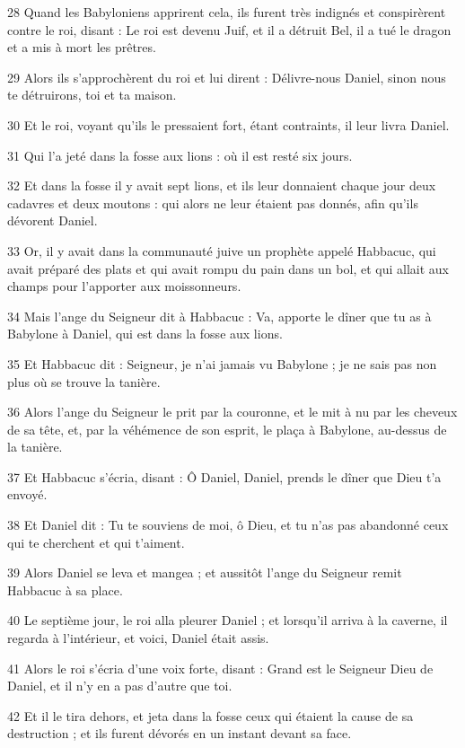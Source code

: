 \par 28 Quand les Babyloniens apprirent cela, ils furent très indignés et conspirèrent contre le roi, disant : Le roi est devenu Juif, et il a détruit Bel, il a tué le dragon et a mis à mort les prêtres.
\par 29 Alors ils s'approchèrent du roi et lui dirent : Délivre-nous Daniel, sinon nous te détruirons, toi et ta maison.
\par 30 Et le roi, voyant qu'ils le pressaient fort, étant contraints, il leur livra Daniel.
\par 31 Qui l'a jeté dans la fosse aux lions : où il est resté six jours.
\par 32 Et dans la fosse il y avait sept lions, et ils leur donnaient chaque jour deux cadavres et deux moutons : qui alors ne leur étaient pas donnés, afin qu'ils dévorent Daniel.
\par 33 Or, il y avait dans la communauté juive un prophète appelé Habbacuc, qui avait préparé des plats et qui avait rompu du pain dans un bol, et qui allait aux champs pour l'apporter aux moissonneurs.
\par 34 Mais l'ange du Seigneur dit à Habbacuc : Va, apporte le dîner que tu as à Babylone à Daniel, qui est dans la fosse aux lions.
\par 35 Et Habbacuc dit : Seigneur, je n'ai jamais vu Babylone ; je ne sais pas non plus où se trouve la tanière.
\par 36 Alors l'ange du Seigneur le prit par la couronne, et le mit à nu par les cheveux de sa tête, et, par la véhémence de son esprit, le plaça à Babylone, au-dessus de la tanière.
\par 37 Et Habbacuc s'écria, disant : Ô Daniel, Daniel, prends le dîner que Dieu t'a envoyé.
\par 38 Et Daniel dit : Tu te souviens de moi, ô Dieu, et tu n'as pas abandonné ceux qui te cherchent et qui t'aiment.
\par 39 Alors Daniel se leva et mangea ; et aussitôt l'ange du Seigneur remit Habbacuc à sa place.
\par 40 Le septième jour, le roi alla pleurer Daniel ; et lorsqu'il arriva à la caverne, il regarda à l'intérieur, et voici, Daniel était assis.
\par 41 Alors le roi s'écria d'une voix forte, disant : Grand est le Seigneur Dieu de Daniel, et il n'y en a pas d'autre que toi.
\par 42 Et il le tira dehors, et jeta dans la fosse ceux qui étaient la cause de sa destruction ; et ils furent dévorés en un instant devant sa face.

